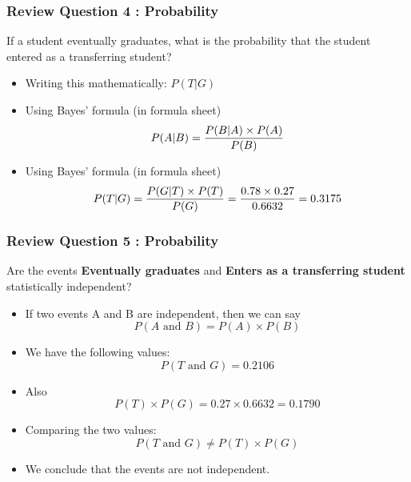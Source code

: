 \documentclass[a4]{beamer}
\begin{document}
\begin{frame}
\frametitle{Review Question 4 :  Probability}
If a student eventually graduates, what is the probability that the student entered
as a transferring student?
\begin{itemize}
\item Writing this mathematically: $P(T|G)$
\item Using Bayes' formula (in formula sheet)
\[P(A|B)=  {P(B|A)\times P(A)\over P(B)} \]
\item Using Bayes' formula (in formula sheet)
\[P(T|G)=  {P(G|T)\times P(T)\over P(G)} = \frac{0.78 \times 0.27}{0.6632} = 0.3175 \]
\end{itemize}
\end{frame}
\begin{frame}
\frametitle{Review Question 5 :  Probability}
Are the events \textbf{Eventually graduates} and \textbf{Enters as a transferring student}
statistically independent?

\begin{itemize}
\item If two events A and B are independent, then we can say
\[P(A \mbox{ and } B) = P(A) \times P(B)\]
\item We have the following values:
\[P(T \mbox{ and } G) = 0.2106\]
\item Also
\[P(T) \times P(G) = 0.27 \times 0.6632 = 0.1790\]
\item Comparing the two values:
\[P(T \mbox{ and } G) \neq P(T) \times P(G)\]
\item We conclude that the events are not independent.
\end{itemize}
\end{frame}
\end{document}
